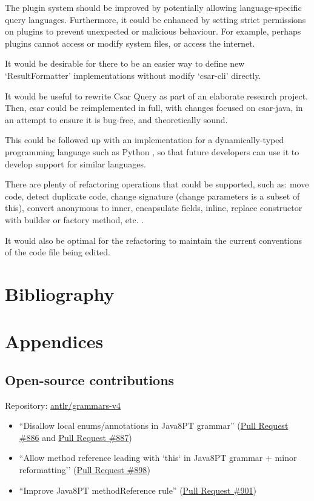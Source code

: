 \documentclass[12pt, letterpaper]{article}
\begin{document}
The plugin system should be improved by potentially allowing language-specific query languages.
Furthermore, it could be enhanced by setting strict permissions on plugins to prevent unexpected or malicious behaviour.
For example, perhaps plugins cannot access or modify system files, or access the internet.

It would be desirable for there to be an easier way to define new `ResultFormatter' implementations without modify `csar-cli' directly.

It would be useful to rewrite Csar Query as part of an elaborate research project.
Then, csar could be reimplemented in full, with changes focused on csar-java, in an attempt to ensure it is bug-free, and theoretically sound.

This could be followed up with an implementation for a dynamically-typed programming language such as Python \autocite{learningpython5thed}, so that future developers can use it to develop support for similar languages.

There are plenty of refactoring operations that could be supported, such as: move code, detect duplicate code, change signature (change parameters is a subset of this), convert anonymous to inner, encapsulate fields, inline, replace constructor with builder or factory method, etc. \autocite{intellijidearefactoring}.

It would also be optimal for the refactoring to maintain the current conventions of the code file being edited.

\section{Bibliography}
\printbibliography[heading=none]

\section{Appendices}

\subsection{Open-source contributions}
\label{apx:OpenSourceContributions}
Repository: \href{https://github.com/antlr/grammars-v4}{antlr/grammars-v4}
\begin{itemize}
  \item ``Disallow local enums/annotations in Java8PT grammar'' (\href{https://github.com/antlr/grammars-v4/pull/886}{Pull Request \#886} and \href{https://github.com/antlr/grammars-v4/pull/887}{Pull Request \#887})
  \item ``Allow method reference leading with `this` in Java8PT grammar + minor reformatting'' (\href{https://github.com/antlr/grammars-v4/pull/898}{Pull Request \#898})
  \item ``Improve Java8PT methodReference rule'' (\href{https://github.com/antlr/grammars-v4/pull/901}{Pull Request \#901})
\end{itemize}
\end{document}
